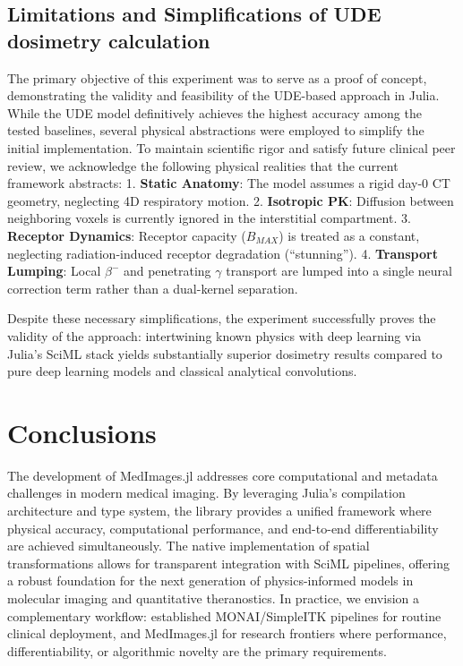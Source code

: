 \documentclass[a4paper,10pt]{elsarticle}
\begin{document}
\subsection{Limitations and Simplifications of UDE dosimetry calculation}
The primary objective of this experiment was to serve as a proof of concept, demonstrating the validity and feasibility of the UDE-based approach in Julia. While the UDE model definitively achieves the highest accuracy among the tested baselines, several physical abstractions were employed to simplify the initial implementation. To maintain scientific rigor and satisfy future clinical peer review, we acknowledge the following physical realities that the current framework abstracts:
1. \textbf{Static Anatomy}: The model assumes a rigid day-0 CT geometry, neglecting 4D respiratory motion.
2. \textbf{Isotropic PK}: Diffusion between neighboring voxels is currently ignored in the interstitial compartment.
3. \textbf{Receptor Dynamics}: Receptor capacity ($B_{MAX}$) is treated as a constant, neglecting radiation-induced receptor degradation (``stunning'').
4. \textbf{Transport Lumping}: Local $\beta^-$ and penetrating $\gamma$ transport are lumped into a single neural correction term rather than a dual-kernel separation.

Despite these necessary simplifications, the experiment successfully proves the validity of the approach: intertwining known physics with deep learning via Julia's SciML stack yields substantially superior dosimetry results compared to pure deep learning models and classical analytical convolutions.


\section{Conclusions}
The development of MedImages.jl addresses core computational and metadata challenges in modern medical imaging. By leveraging Julia's compilation architecture and type system, the library provides a unified framework where physical accuracy, computational performance, and end-to-end differentiability are achieved simultaneously. The native implementation of spatial transformations allows for transparent integration with SciML pipelines, offering a robust foundation for the next generation of physics-informed models in molecular imaging and quantitative theranostics.
In practice, we envision a complementary workflow: established MONAI/SimpleITK pipelines for routine clinical deployment, and MedImages.jl for research frontiers where performance, differentiability, or algorithmic novelty are the primary requirements.
\end{document}

